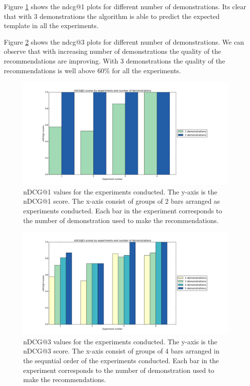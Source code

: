 Figure \ref{ndcg 1} shows the \acrshort{ndcg}@1 plots for different number of 
demonstrations. Its clear that with 3 demonstrations the algorithm is able to
predict the expected template in all the experiments.

Figure \ref{ndcg 3} shows the \acrshort{ndcg}@3 plots for different number of 
demonstrations. We can observe that with increasing number of demonstrations the
quality of the recommendations are improving. With 3 demonstrations the 
quality of the recommendations is well above 60\% for all the experiments.

\begin{figure}[htp]
\centering
\includegraphics[scale=0.4]{images/nDCG@1.png}
\caption[nDCG@1 score based comparison]{nDCG@1 values for the experiments conducted.
The y-axis is the nDCG@1 score. The x-axis consist of groups of 2 bars arranged
as experiments conducted. Each bar in the experiment corresponds to the number
of demonstration used to make the recommendations. }
\label{ndcg 1}
\end{figure}

\begin{figure}[htp]
\centering
\includegraphics[scale=0.4]{images/nDCG@3.png}
\caption[nDCG@3 score based comparison]{nDCG@3 values for the experiments conducted.
The y-axis is the nDCG@3 score. The x-axis consist of groups of 4 bars arranged
in the sequntial order of the  experiments conducted. Each bar in the experiment corresponds to the number
of demonstration used to make the recommendations. }
\label{ndcg 3}
\end{figure}
\FloatBarrier
